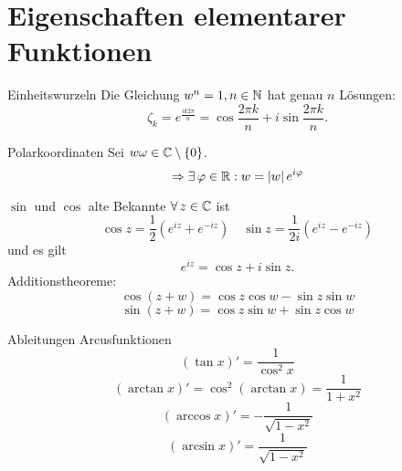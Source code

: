 \documentclass[main.tex]{subfiles}
\begin{document}
\section*{Eigenschaften elementarer Funktionen}

\begin{karte}{Einheitswurzeln}
    Die Gleichung \( w^n = 1, n \in \mathbb{N} \) hat 
    genau \(n\) Lösungen:
    \[ \zeta_k = e^{\frac{ik2\pi}{n}} 
    = \cos \frac{2\pi k}{n} + i \sin \frac{2\pi k}{n}. \]
\end{karte}

\begin{karte}{Polarkoordinaten}
    Sei \( w \omega\in \mathbb{C} \setminus \{0\} \).
    \[ \Rightarrow \exists \varphi \in \R: w = \abs{w}e^{i\varphi} \]
\end{karte}

\begin{karte}{\(\sin\) und \( \cos \) \textendash{} alte Bekannte}
    \( \forall z \in \C \) ist 
    \[ \cos z = \frac{1}{2}(e^{iz} + e^{-iz}) \quad \sin z = \frac{1}{2i}(e^{iz} - e^{-iz}) \]
    und es gilt
    \[ e^{iz} = \cos z + i \sin z. \]
    Additionstheoreme:
    \[ \cos(z+w) = \cos z \cos w - \sin z \sin w \]
    \[ \sin(z+w) = \cos z \sin w + \sin z \cos w \]
\end{karte}

\begin{karte}{Ableitungen Arcusfunktionen}
    \[ (\tan x)' = \frac{1}{\cos^2 x} \]
    \[ (\arctan x)' = \cos^2(\arctan x) = \frac{1}{1+x^2} \]
    \[ (\arccos x)' = -\frac{1}{\sqrt{1-x^2}} \]
    \[ (\arcsin x)' = \frac{1}{\sqrt{1-x^2}} \]
\end{karte}
\end{document}
